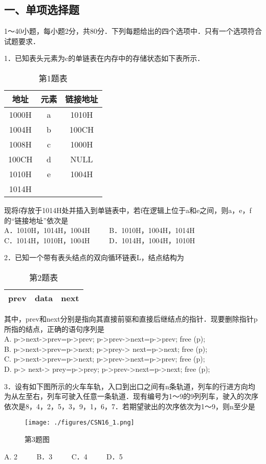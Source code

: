 
\subsection{一、单项选择题}
1～40小题，每小题2分，共80分．下列每题给出的四个选项中．只有一个选项符合试题要求．

1．已知表头元素为c的单链表在内存中的存储状态如下表所示．
\begin{table}[ht]
\centering
\caption{第1题表}\label{CSN16_tab1}
\begin{tabular}{|c|c|c|}
\hline
地址 & 元素 & 链接地址 \\
\hline
1000H & a & 1010H \\
\hline
1004H & b & 100CH \\
\hline
1008H & c & 1000H \\
\hline
100CH & d & NULL \\
\hline
1010H & e & 1004H \\
\hline
1014H &   &  \\
\hline
\end{tabular}
\end{table}
现将f存放于1014H处并插入到单链表中，若f在逻辑上位于a和e之间，则a，e，f的“链接地址”依次是 \\
A．1010H，1014H，1004H $\qquad$ B．1010H，1004H，1014H \\
C．1014H，1010H，1004H $\qquad$ D．1014H，1004H，1010H

2．已知一个带有表头结点的双向循环链表L，结点结构为 \\
\begin{table}[ht]
\centering
\caption{第2题表}\label{CSN16_tab2}
\begin{tabular}{|c|c|c|}
\hline
prev & data & next \\
\hline
\end{tabular}
\end{table}
其中，prev和next分别是指向其直接前驱和直接后继结点的指针．现要删除指针p所指的结点，正确的语句序列是 \\
A. p->next->prev=p->prev; p->prev->next=p->prev; free (p); \\
B. p->next->prev=p->next; p->prey-> next=p->next; free (p); \\
C. p->next->prev=p->next; p->prev->next=p->prev; free (p); \\
D. p-> next-> prey=p->prey; p->prev->next=p->next; free (p);

3．设有如下图所示的火车车轨，入口到出口之间有n条轨道，列车的行进方向均为从左至右，列车可驶入任意一条轨道．现有编号为1～9的9列列车，驶入的次序依次是8，4，2，5，3，9，1，6，7．若期望驶出的次序依次为1～9，则n至少是 \\
\begin{figure}[ht]
\centering
\texttt{[image: ./figures/CSN16\_1.png]}
\caption{第3题图} \label{CSN16_fig1}
\end{figure}
A. 2 $\qquad$ B．3 $\qquad$ C．4 $\qquad$ D．5

